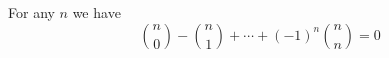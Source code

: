 

\setcounter{section}{3}
\setcounter{subsection}{4}
\setcounter{dfn}{8}

\begin{thm}
\label{thm:BinAltern}
For any $n$ we have
\[
\binom{n}{0} - \binom{n}{1} + \cdots + (-1)^n\binom{n}{n} = 0
\]
\end{thm}

